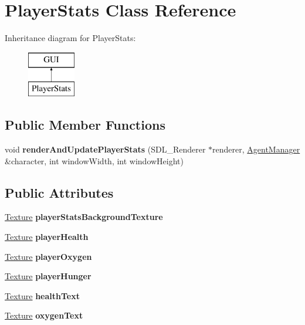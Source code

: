 \hypertarget{class_player_stats}{}\section{Player\+Stats Class Reference}
\label{class_player_stats}
Inheritance diagram for Player\+Stats\+:\begin{figure}[H]
\begin{center}
\leavevmode
\includegraphics[height=2.000000cm]{class_player_stats}
\end{center}
\end{figure}
\subsection*{Public Member Functions}
\begin{DoxyCompactItemize}
\item 
\mbox{\label{class_player_stats_afc6a36e074436e5b3ce922f9d192fb46}} 
void {\bfseries render\+And\+Update\+Player\+Stats} (S\+D\+L\+\_\+\+Renderer $\ast$renderer, \hyperlink{class_agent_manager}{Agent\+Manager} \&character, int window\+Width, int window\+Height)
\end{DoxyCompactItemize}
\subsection*{Public Attributes}
\begin{DoxyCompactItemize}
\item 
\mbox{\label{class_player_stats_acb028559ae1d74fbc8fda7eeac7c55ed}} 
\hyperlink{class_texture}{Texture} {\bfseries player\+Stats\+Background\+Texture}
\item 
\mbox{\label{class_player_stats_a6916703003f748e94c48a83bdb122654}} 
\hyperlink{class_texture}{Texture} {\bfseries player\+Health}
\item 
\mbox{\label{class_player_stats_a3fbd15fb06abec48e89d3e2e8538d245}} 
\hyperlink{class_texture}{Texture} {\bfseries player\+Oxygen}
\item 
\mbox{\label{class_player_stats_a441c84f6a9b55e2bce22743e2da6cb49}} 
\hyperlink{class_texture}{Texture} {\bfseries player\+Hunger}
\item 
\mbox{\label{class_player_stats_a7c81f7cdc2dd7afed2678b909f369389}} 
\hyperlink{class_texture}{Texture} {\bfseries health\+Text}
\item 
\mbox{\label{class_player_stats_a014ad313a6eb58fdd3d70f71fc5dc515}} 
\hyperlink{class_texture}{Texture} {\bfseries oxygen\+Text}
\end{DoxyCompactItemize}
